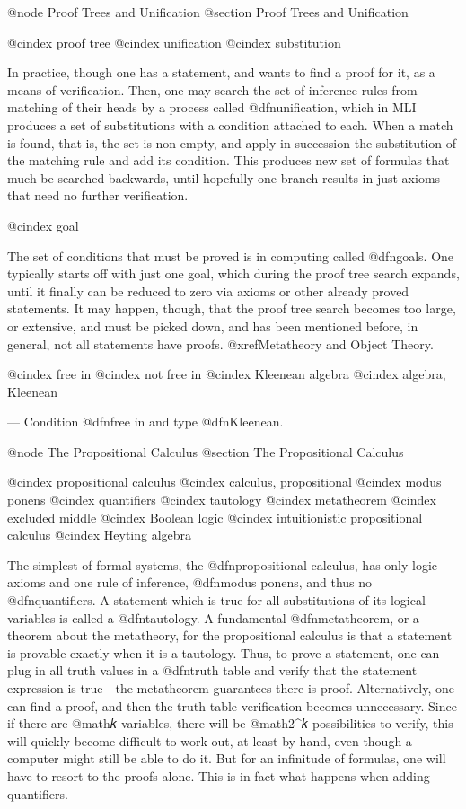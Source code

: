 @node Proof Trees and Unification
@section Proof Trees and Unification

@cindex proof tree
@cindex unification
@cindex substitution

In practice, though one has a statement, and wants to find a proof for it, as a means of verification. Then, one may search the set of inference rules from matching of their heads by a process called @dfn{unification}, which in MLI produces a set of substitutions with a condition attached to each. When a match is found, that is, the set is non-empty, and apply in succession the substitution of the matching rule and add its condition. This produces new set of formulas that much be searched backwards, until hopefully one branch results in just axioms that need no further verification.

@cindex goal

The set of conditions that must be proved is in computing called @dfn{goals}. One typically starts off with just one goal, which during the proof tree search expands, until it finally can be reduced to zero via axioms or other already proved statements. It may happen, though, that the proof tree search becomes too large, or extensive, and must be picked down, and has been mentioned before, in general, not all statements have proofs. @xref{Metatheory and Object Theory}.


@cindex free in
@cindex not free in
@cindex Kleenean algebra
@cindex algebra, Kleenean


— Condition @dfn{free in} and type @dfn{Kleenean}.


@node The Propositional Calculus
@section The Propositional Calculus

@cindex propositional calculus
@cindex calculus, propositional
@cindex modus ponens
@cindex quantifiers
@cindex tautology
@cindex metatheorem
@cindex excluded middle
@cindex Boolean logic
@cindex intuitionistic propositional calculus
@cindex Heyting algebra

The simplest of formal systems, the @dfn{propositional calculus}, has only logic axioms and one rule of inference, @dfn{modus ponens}, and thus no @dfn{quantifiers}. A statement which is true for all substitutions of its logical variables is called a @dfn{tautology}. A fundamental @dfn{metatheorem}, or a theorem about the metatheory, for the propositional calculus is that a statement is provable exactly when it is a tautology. Thus, to prove a statement, one can plug in all truth values in a @dfn{truth table} and verify that the statement expression is true—the metatheorem guarantees there is proof. Alternatively, one can find a proof, and then the truth table verification becomes unnecessary. Since if there are @math{𝑘} variables, there will be @math{2^𝑘} possibilities to verify, this will quickly become difficult to work out, at least by hand, even though a computer might still be able to do it. But for an infinitude of formulas, one will have to resort to the proofs alone. This is in fact what happens when adding quantifiers.


